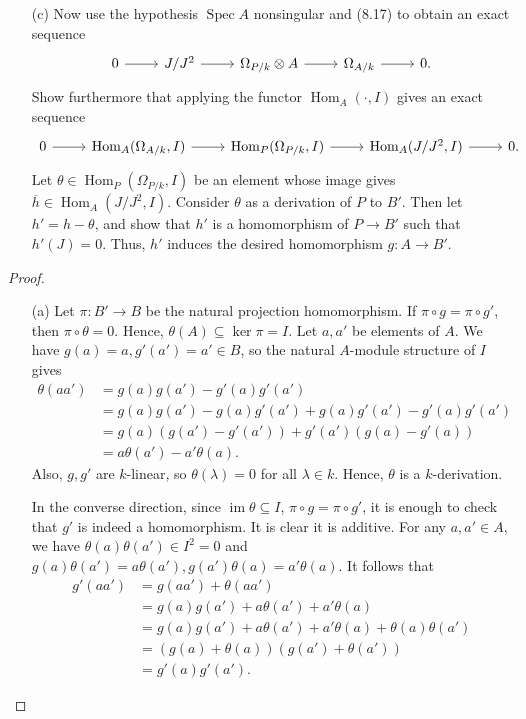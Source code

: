 \documentclass{article}
\DeclareMathOperator{\im}{im}
\DeclareMathOperator{\Hom}{Hom}
\DeclareMathOperator{\spec}{Spec}
\begin{document}
\begin{enumerate} [label=\textbf{\arabic*.}, leftmargin=0em]
\begin{itemize} [leftmargin=0cm]
    \item[(c)] Now use the hypothesis $\spec{A}$ nonsingular and (8.17) to obtain an exact sequence
    \[ \begin{tikzcd}
        0 \arrow[r] & {J/J^2} \arrow[r] & {\Omega_{P/k} \otimes A} \arrow[r] & {\Omega_{A/k}} \arrow[r] & 0.
        \end{tikzcd} \]
    Show furthermore that applying the functor $\Hom_A(\cdot, I)$ gives an exact sequence
    \[ \begin{tikzcd}
        0 \arrow[r] & {\Hom_A(\Omega_{A/k},I)} \arrow[r] & {\Hom_P(\Omega_{P/k},I)} \arrow[r] & {\Hom_A(J/J^2,I)} \arrow[r] & 0.
        \end{tikzcd} \]
    Let $\theta \in \Hom_P(\Omega_{P/k}, I)$ be an element whose image gives $\overline{h} \in \Hom_A(J/J^2, I)$. Consider $\theta$ as a derivation of $P$ to $B'$. Then let $h' = h - \theta$, and show that $h'$ is a homomorphism of $P \to B'$ such that $h'(J) = 0$. Thus, $h'$ induces the desired homomorphism $g : A \to B'$.
\end{itemize}

\begin{proof} $ $ \vspace{0pt}
\begin{itemize} [leftmargin=0cm]
\item[(a)] Let $\pi : B' \to B$ be the natural projection homomorphism. If $\pi \circ g = \pi \circ g'$, then $\pi \circ \theta = 0$. Hence, $\theta(A) \subseteq \ker{\pi} = I$. Let $a, a'$ be elements of $A$. We have $g(a) = a, g'(a') = a' \in B$, so the natural $A$-module structure of $I$ gives
\begin{align*}
    \theta(aa') & = g(a)g(a') - g'(a)g'(a') \\
    & = g(a) g(a') - g(a) g'(a') + g(a) g'(a') - g'(a) g'(a') \\
    & = g(a) (g(a') - g'(a')) + g'(a')(g(a) - g'(a)) \\
    & = a \theta(a') - a' \theta(a).
\end{align*}
Also, $g, g'$ are $k$-linear, so $\theta(\lambda) = 0$ for all $\lambda \in k$. Hence, $\theta$ is a $k$-derivation.

In the converse direction, since $\im{\theta} \subseteq I$, $\pi \circ g = \pi \circ g'$, it is enough to check that $g'$ is indeed a homomorphism. It is clear it is additive. For any $a, a' \in A$, we have $\theta(a)\theta(a') \in I^2 = 0$ and $g(a)\theta(a') = a\theta(a'), g(a')\theta(a) = a'\theta(a)$. It follows that
\begin{align*}
    g'(aa') & = g(aa') + \theta(aa') \\
    & = g(a)g(a') + a\theta(a') + a'\theta(a) \\
    & = g(a)g(a') + a\theta(a') + a'\theta(a) + \theta(a) \theta(a') \\
    & = (g(a) + \theta(a))(g(a') + \theta(a')) \\
    & = g'(a)g'(a').
\end{align*}


\end{itemize}
\end{proof}
\end{enumerate}
\end{document}
